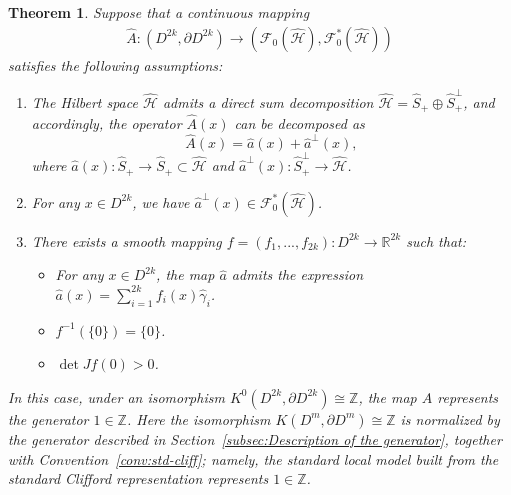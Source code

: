 \documentclass{amsart}
\newtheorem{thm}{Theorem}[section]
\theoremstyle{definition}
\theoremstyle{remark}
\begin{document}
\begin{thm}\label{thm:4.10}
Suppose that a continuous mapping 
\begin{align*}
\hat{A} \colon(D^{2k},\partial D^{2k})\to (\mathcal{F}_{0}(\mathcal{\hat{H}}),\mathcal{F}^{*}_{0}(\mathcal{\hat{H}}))
\end{align*}
satisfies the following assumptions:
\begin{enumerate}
\item The Hilbert space \( \hat{\mathcal{H}} \) admits a direct sum decomposition 
\( \hat{\mathcal{H}} = \hat{S}_{+} \oplus \hat{S}_{+}^{\perp} \), and accordingly, 
the operator \( \hat{A}(x) \) can be decomposed as 
\[
\hat{A}(x) = \hat{a}(x) + \hat{a}^{\perp}(x),
\]
where \( \hat{a}(x) \colon \hat{S}_{+} \to \hat{S}_{+} \subset \hat{\mathcal{H}} \) 
and \( \hat{a}^{\perp}(x) \colon \hat{S}_{+}^{\perp} \to \hat{\mathcal{H}} \).\\
\item For any $x \in D^{2k}$, we have $\hat{a}^{\perp}(x)\in \mathcal{F}^{*}_{0}(\mathcal{\hat{\mathcal{H}}})$.\\
\item There exists a smooth mapping $f=(f_1,...,f_{2k})\colon D^{2k}\to \mathbb{R}^{2k}$ such that:\\
\begin{itemize}
    \item  For any $x \in D^{2k}$, the map $\hat{a}$ admits the expression $\hat{a}(x)=\sum_{i=1}^{2k}f_i(x)\hat{\gamma}_i$.
    \item $f^{-1}(\{0\})=\{0\}$.
    \item $\det Jf(0)>0$.
\end{itemize}
\end{enumerate}
In this case, under an isomorphism $K^{0}(D^{2k},\partial D^{2k})\cong \mathbb{Z}$, the map $\hat{A}$ represents the generator $1 \in \mathbb{Z}$. Here the isomorphism $K(D^{m},\partial D^{m})\cong \mathbb{Z}$ is normalized by the generator described in Section~\ref{subsec:Description of the generator}, together with Convention~\ref{conv:std-cliff}; namely, the standard local model built from the standard Clifford representation represents $1\in\mathbb{Z}$.
\end{thm}
                                                   
\end{document}

